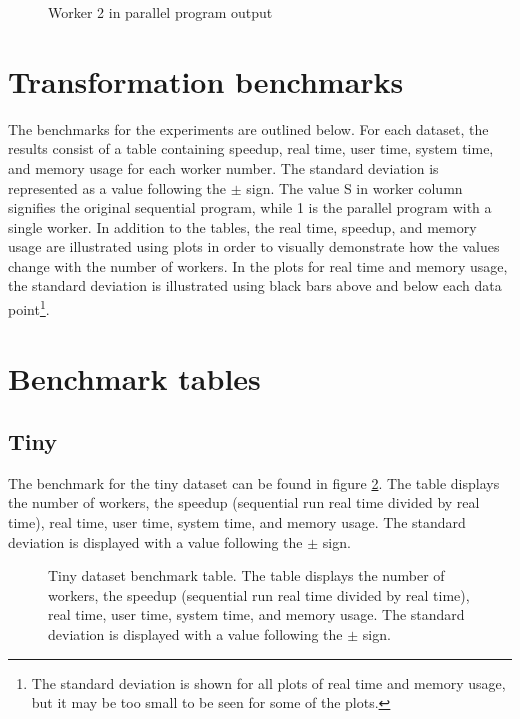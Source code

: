\begin{figure}[ht]
  
  \caption{Worker 2 in parallel program  output}
  \label{fig:parallel_profiler_w2}
\end{figure}
\clearpage

\section{Transformation benchmarks}
The benchmarks for the experiments are outlined below. For each dataset, the results consist of a table containing
speedup, real time, user time, system time, and memory usage for each worker number. The standard deviation is represented
as a value following the $\pm$ sign. The value S in worker column signifies the original sequential program, while 1 is the
parallel program with a single worker. In addition to the tables, the real time, speedup, and memory usage are illustrated
using plots in order to visually demonstrate how the values change with the number of workers. In the plots for real time
and memory usage, the standard deviation is illustrated using black bars above and below each data point\footnote{
The standard deviation is shown for all plots of real time and memory usage, but it may be too small to be seen for some of the plots.}.

\section{Benchmark tables}
\subsection{Tiny}
The benchmark for the tiny dataset can be found in figure \ref{fig:dataset_1_table}.
The table displays the number of workers, the speedup (sequential run real time divided by real time), real time,
user time, system time, and memory usage. The standard deviation is displayed with a value following the $\pm$ sign.

\begin{figure}[ht]
\centering
{}
\caption[Tiny dataset benchmark table.]{Tiny dataset benchmark table. The table displays the number of workers, the speedup (sequential run real time divided by real time), real time,
user time, system time, and memory usage. The standard deviation is displayed with a value following the $\pm$ sign.}
\label{fig:dataset_1_table}
\end{figure}

